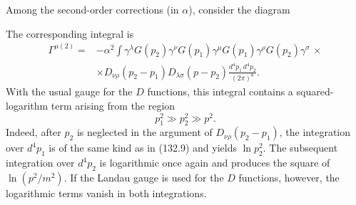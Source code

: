 Among the second-order corrections (in $\alpha$), consider the diagram
\begin{center}
\end{center}
The corresponding integral is
\[
\begin{aligned}
\Gamma^{\mu(2)}={}&-\alpha^2\int
\gamma^\lambda G(p_2)\gamma^\nu G(p_1)\gamma^\mu G(p_1)\gamma^\rho G(p_2)\gamma^\sigma\,\times\\
&\times D_{\nu\rho}(p_2-p_1)D_{\lambda\sigma}(p-p_2)
\frac{d^4p_1\,d^4p_2}{(2\pi)^8}.
\end{aligned}
\]
With the usual gauge for the $D$ functions, this integral contains a squared-logarithm term arising from the region
\begin{equation}
p_1^2\gg p_2^2\gg p^2.
\tag{132.11}
\end{equation}
Indeed, after $p_2$ is neglected in the argument of $D_{\nu\rho}(p_2-p_1)$, the integration over $d^4p_1$ is of the same kind as in (132.9) and yields $\ln p_2^2$. The subsequent integration over $d^4p_2$ is logarithmic once again and produces the square of $\ln(p^2/m^2)$. If the Landau gauge is used for the $D$ functions, however, the logarithmic terms vanish in both integrations.

